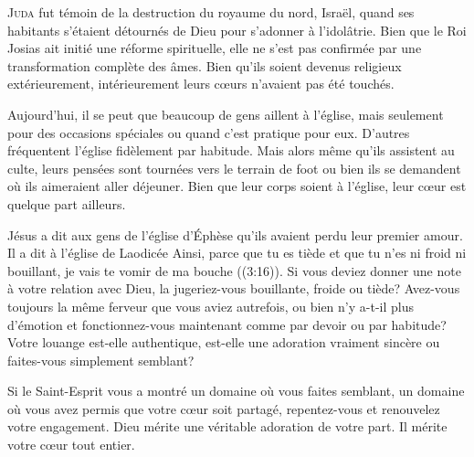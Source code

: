 \lettrine{J}{uda} fut témoin de la destruction du royaume du nord, Israël,
 quand ses habitants s'étaient détournés de Dieu pour s'adonner
 à l'idolâtrie. Bien que le Roi Josias ait initié une réforme spirituelle,
 elle ne s'est pas confirmée par une transformation complète des âmes.
 Bien qu'ils soient devenus religieux extérieurement,
 intérieurement leurs c\oe{}urs n'avaient pas 
 été touchés. 

Aujourd'hui, il se peut que beaucoup de gens aillent à l'église,
 mais seulement pour des occasions spéciales ou quand c'est pratique pour eux.
 D'autres fréquentent l'église fidèlement \ocadr par habitude.
 Mais alors même qu'ils assistent au culte, leurs pensées sont tournées
 vers le terrain de foot ou bien ils se demandent où ils aimeraient
 aller déjeuner. Bien que leur corps soient à l'église,
 leur c\oe{}ur est quelque part ailleurs. 


Jésus a dit aux gens de l'église d'Éphèse qu'ils avaient perdu
 leur premier amour. Il a dit à l'église de Laodicée\frcolon{} 
 \Og Ainsi, parce que tu es tiède et que tu n'es ni froid ni bouillant,
 je vais te vomir de ma bouche \Fg{} 
 ((3:16)).
 Si vous deviez donner une note à votre relation avec Dieu,
 la jugeriez-vous bouillante, froide ou tiède?
 Avez-vous toujours la même ferveur que vous aviez autrefois,
 ou bien n'y a-t-il plus d'émotion et fonctionnez-vous maintenant
 comme par devoir ou par habitude? Votre louange est-elle authentique,
 est-elle une adoration vraiment sincère ou faites-vous simplement semblant? 

Si le Saint-Esprit vous a montré un domaine où vous faites semblant,
 un domaine où vous avez permis que votre c\oe{}ur soit partagé,
 repentez-vous et renouvelez votre engagement. Dieu mérite une véritable
 adoration de votre part. Il mérite votre c\oe{}ur tout entier. 

\dvrule




